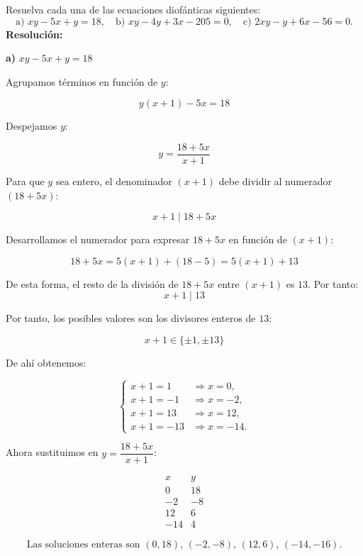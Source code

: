 \documentclass[a4paper,12pt]{article}
\begin{document}
\begin{ejercicio}[title=Ejercicio 19]
Resuelva cada una de las ecuaciones diofánticas siguientes:
\[
\text{a) } xy - 5x + y = 18, \quad
\text{b) } xy - 4y + 3x - 205 = 0, \quad
\text{c) } 2xy - y + 6x - 56 = 0.
\]
\tcblower
\textbf{Resolución:}

\textbf{a) } $xy - 5x + y = 18$

\vspace{0.3em}
Agrupamos términos en función de $y$:

\[
y(x + 1) - 5x = 18
\]

Despejamos $y$:

\[
y = \frac{18 + 5x}{x + 1}
\]

Para que $y$ sea entero, el denominador $(x + 1)$ debe dividir al numerador $(18 + 5x)$:

\[
x + 1 \mid 18 + 5x
\]

Desarrollamos el numerador para expresar $18 + 5x$ en función de $(x+1)$:

\[
18 + 5x = 5(x + 1) + (18 - 5) = 5(x + 1) + 13
\]

\vspace{0.5em}

De esta forma, el resto de la división de $18 + 5x$ entre $(x + 1)$ es $13$.  
Por tanto:
\[
x + 1 \mid 13
\]

Por tanto, los posibles valores son los divisores enteros de $13$:

\[
x + 1 \in \{\pm1, \pm13\}
\]

De ahí obtenemos:

\[
\begin{cases}
x + 1 = 1 &\Rightarrow x = 0,\\[0.3em]
x + 1 = -1 &\Rightarrow x = -2,\\[0.3em]
x + 1 = 13 &\Rightarrow x = 12,\\[0.3em]
x + 1 = -13 &\Rightarrow x = -14.
\end{cases}
\]

Ahora sustituimos en $y = \dfrac{18 + 5x}{x + 1}$:

\[
\begin{array}{c|c}
x & y\\
\hline
0 & 18 \\
-2 & -8 \\
12 & 6 \\
-14 & 4
\end{array}
\]

\vspace{0.5em}

\[
\boxed{\text{Las soluciones enteras son } (0,18),\, (-2,-8),\, (12,6),\, (-14,-16).}
\]

\end{ejercicio}
\end{document}
